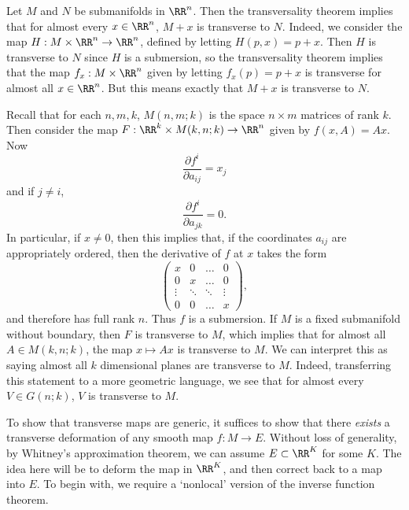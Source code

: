 \begin{example}
    Let $M$ and $N$ be submanifolds in $\RR^n$. Then the transversality theorem implies that for almost every $x \in \RR^n$, $M + x$ is transverse to $N$. Indeed, we consider the map $H: M \times \RR^n \to \RR^n$, defined by letting $H(p,x) = p + x$. Then $H$ is transverse to $N$ since $H$ is a submersion, so the transversality theorem implies that the map $f_x: M \times \RR^n$ given by letting $f_x(p) = p + x$ is transverse for almost all $x \in \RR^n$. But this means exactly that $M + x$ is transverse to $N$.
\end{example}

\begin{example}
    Recall that for each $n,m,k$, $M(n,m;k)$ is the space $n \times m$ matrices of rank $k$. Then consider the map $F: \RR^k \times M(k,n;k) \to \RR^n$ given by $f(x,A) = Ax$. Now
    \[ \frac{\partial f^i}{\partial a_{ij}} = x_j \]
    and if $j \neq i$,
    \[ \frac{\partial f^i}{\partial a_{jk}} = 0. \]
    In particular, if $x \neq 0$, then this implies that, if the coordinates $a_{ij}$ are appropriately ordered, then the derivative of $f$ at $x$ takes the form
    \[ \begin{pmatrix} x & 0 & \dots & 0 \\ 0 & x & \dots & 0 \\ \vdots & \ddots & \ddots & \vdots \\ 0 & 0 & \dots & x \end{pmatrix}, \]
    and therefore has full rank $n$. Thus $f$ is a submersion. If $M$ is a fixed submanifold without boundary, then $F$ is transverse to $M$, which implies that for almost all $A \in M(k,n;k)$, the map $x \mapsto Ax$ is transverse to $M$. We can interpret this as saying almost all $k$ dimensional planes are transverse to $M$. Indeed, transferring this statement to a more geometric language, we see that for almost every $V \in G(n;k)$, $V$ is transverse to $M$.
\end{example}

To show that transverse maps are generic, it suffices to show that there \emph{exists} a transverse deformation of any smooth map $f:M \to E$. Without loss of generality, by Whitney's approximation theorem, we can assume $E \subset \RR^K$ for some $K$. The idea here will be to deform the map in $\RR^K$, and then correct back to a map into $E$. To begin with, we require a `nonlocal' version of the inverse function theorem.


